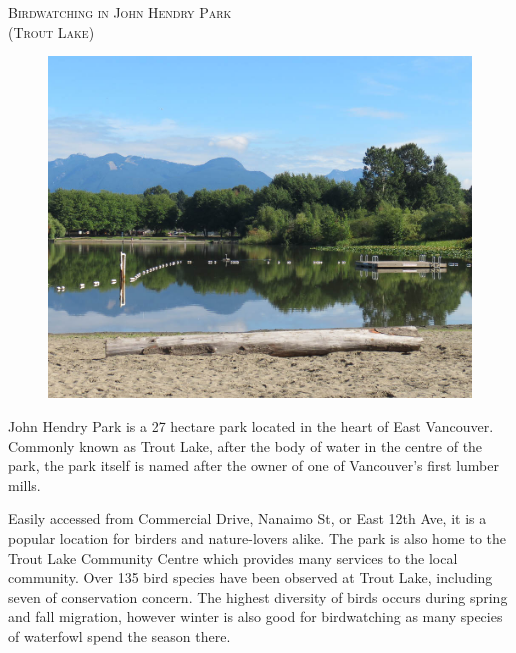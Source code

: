 

\begin{center}
\textsc{\LARGE Birdwatching in John Hendry Park}\\[0.2cm]
\textsc{\Large (Trout Lake)}\\[0.2cm]
\end{center}

\begin{figure}[h]
  \centering
  \includegraphics[width=\textwidth]{photos/TL1}
\end{figure}

\large
John Hendry Park is a 27 hectare park located in the heart of East Vancouver. 
Commonly known as Trout Lake, after the body of water in the centre of the park, the 
park itself is named after the owner of one of Vancouver's first lumber mills. 

Easily accessed from Commercial Drive, Nanaimo St, or East 12th Ave, it is a popular location 
for birders and nature-lovers alike. The park is also home to the 
Trout Lake Community Centre which provides many services to the local community. 
Over 135 bird species have been observed at Trout Lake, including seven of conservation concern.
The highest diversity of birds occurs during spring and fall migration, however
winter is also good for birdwatching as many species of waterfowl spend the season there.

